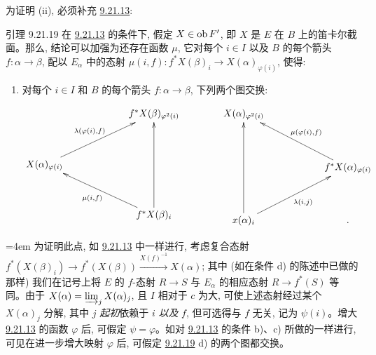 为证明 (ii), 必须补充 \hyperref[I.lem9.21.13]{9.21.13}:

\begin{enonce*}{引理 9.21.19}
在 \hyperref[I.lem9.21.13]{9.21.13} 的条件下, 假定 $X\in \operatorname{ob} F'$, 即 $X$ 是 $E$ 在 $B$ 上的笛卡尔截面。那么, 结论可以加强为还存在函数 $μ$, 它对每个 $i\in I$ 以及 $B$ 的每个箭头 $f:\alpha\rightarrow
\beta$, 配以 $E_{\alpha}$ 中的态射 $μ(i,f):f^\ast
X(\beta)_i\rightarrow X(\alpha)_{\varphi(i)}$, 使得:

\begin{enumerate}
\renewcommand{\theenumi}{\alph{enumi}}
\renewcommand{\labelenumi}{\theenumi)}
\setcounter{enumi}{3}
\item 对每个 $i\in I$ 和 $B$ 的每个箭头 $f:\alpha\rightarrow \beta$, 下列两个图交换:

\begin{displaymath}
\xymatrix@L=5pt@R=1.25cm@C=2.2cm{
                       & f^{\ast}X(\beta)_{\varphi^{2}(i)}\\
X(\alpha)_{\varphi(i)}\ar[ru]^{\lambda(\varphi (i),f)} &\\
                       & f^{\ast}X(\beta)_i \ar[lu]^{\mu(i,f)}\ar[uu]
} \qquad\qquad \xymatrix@L=5pt@R=1.35cm@C=2cm{
X(\alpha)_{\varphi^2(i)} & \\
                         & f^{\ast}X(\alpha)_{\varphi(i)} \ar[lu]_{\mu(\varphi(i),f)}\\
x(\alpha)_i \ar[uu]\ar[ru]_{\lambda(i,j)}             &. }
\end{displaymath}
\end{enumerate}
\end{enonce*}

\begingroup{}\emergencystretch=4em
为\pageoriginale 证明此点, 如 \hyperref[I.lem9.21.13]{9.21.13} 中一样进行, 考虑复合态射 $f^\ast(X(\beta)_i)\rightarrow
f^\ast(X(\beta))\xrightarrow{X(f)^{-1}}X(\alpha)$; 其中 (如在条件 d) 的陈述中已做的那样) 我们在记号上将 $E$ 的 $f$-态射 $R\rightarrow S$ 与 $E_{\alpha}$ 的相应态射 $R\rightarrow f^\ast(S)$ 等同。由于 $X(\alpha)=\varinjlim_j X(\alpha)_j$, 且 $I$ 相对于 $c$ 为大, 可使上述态射经过某个 $X(\alpha)_j$ 分解, 其中 $j$ \textit{起初}依赖于 $i$ \emph{以及} $f$, 但可选得与 $f$ 无关, 记为 $\psi(i)$。增大 \hyperref[I.lem9.21.13]{9.21.13} 的函数 $\varphi$ 后, 可假定 $\psi=\varphi$。如对 \hyperref[I.lem9.21.13]{9.21.13} 的条件 b)、c) 所做的一样进行, 可见在进一步增大映射 $\varphi$ 后, 可假定 \hyperref[I.lem9.21.19]{9.21.19} d) 的两个图都交换。
\par\endgroup

